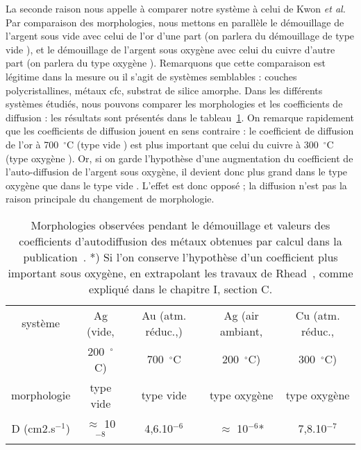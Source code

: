 La seconde raison nous appelle à comparer notre système à celui de Kwon \textit{et al.}~\cite{kwon2003comparison} Par comparaison des morphologies, nous mettons en parallèle le démouillage de l’argent sous vide avec celui de l’or d’une part (on parlera du démouillage de type \og vide \fg), et le démouillage de l’argent sous oxygène avec celui du cuivre d’autre part (on parlera du type \og oxygène \fg). Remarquons que cette comparaison est légitime dans la mesure ou il s’agit de systèmes semblables : couches polycristallines, métaux cfc, substrat de silice amorphe. Dans les différents systèmes étudiés, nous pouvons comparer les morphologies et les coefficients de diffusion : les résultats sont présentés dans le tableau~\ref{tDiffusion}. On remarque rapidement que les coefficients de diffusion jouent en sens contraire : le coefficient de diffusion de l’or à 700~$^\circ$C (type \og vide \fg) est plus important que celui du cuivre à 300~$^\circ$C (type \og oxygène \fg). Or, si on garde l’hypothèse d’une augmentation du coefficient de l’auto-diffusion de l’argent sous oxygène, il devient donc plus grand dans le type \og oxygène \fg{} que dans le type \og vide \fg. L’effet est donc opposé ; la diffusion n’est pas la raison principale du changement de morphologie.\par 
{}
\begin{table}
\centering
\begin{tabular}{ccccc}
\hline
système & Ag (vide, & Au (atm. réduc.,) & Ag (air ambiant, & Cu (atm. réduc.,\\
\hspace{1pt} &  200~$^\circ$C)&  700~$^\circ$C &  200~$^\circ$C) &  300~$^\circ$C)\\
\hline
morphologie & type vide & type vide & type oxygène & type oxygène\\
D (cm2.s$^{-1}$) &  $\approx$ 10$^{-8}$ & 4,6.10$^{-6}$ & $\approx$ 10$^{-6}$* & 7,8.10$^{-7}$\\
\end{tabular}
\caption{Morphologies observées pendant le démouillage et valeurs des coefficients d’autodiffusion des métaux obtenues par calcul dans la publication~\cite{agrawal2002predicting}. *) Si l’on conserve l’hypothèse d’un coefficient plus important sous oxygène, en extrapolant les travaux de Rhead~\cite{rhead1963surface}, comme expliqué dans le chapitre I, section C.}
\label{tDiffusion}
\end{table}

